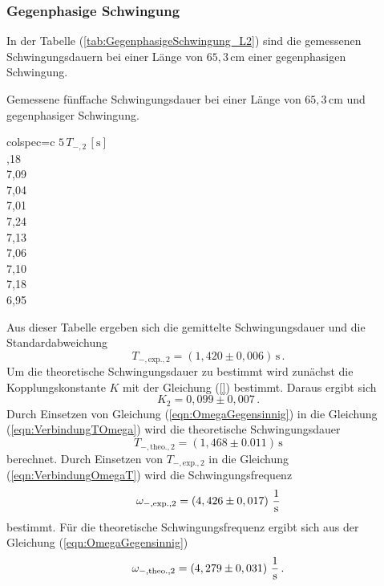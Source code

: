 \subsubsection{Gegenphasige Schwingung}
\label{sec:GegenphasigeSchwingung_LangesPendel}
In der Tabelle (\ref{tab:GegenphasigeSchwingung_L2}) sind die gemessenen Schwingungsdauern bei einer Länge von $65,3\, \unit{\centi\meter}$ einer gegenphasigen
Schwingung. 
\begin{table}[H]
  \centering
  \caption{Gemessene fünffache Schwingungsdauer bei einer Länge von $65,3\, \unit{\centi\meter}$ und gegenphasiger Schwingung.}
  \label{tab:GegenphasigeSchwingung_L2}
  \begin{tblr}{colspec={c}}
      \toprule
      $5\, T_{-, 2}\,\left[\unit{\second}\right]$\\
      ,18 \\
      7,09 \\
      7,04 \\
      7,01 \\
      7,24 \\
      7,13 \\
      7,06 \\
      7,10 \\
      7,18 \\
      6,95 \\
      \bottomrule
  \end{tblr}
\end{table}
Aus dieser Tabelle ergeben sich die gemittelte Schwingungsdauer und die Standardabweichung
$$T_{-,\text{exp.},2} = \left(1,420 \pm 0,006\right)\,\unit{\second}\,.$$
Um die theoretische Schwingungsdauer zu bestimmt wird zunächst die Kopplungskonstante $K$ mit der
Gleichung (\ref{}) bestimmt. Daraus ergibt sich
$$K_{2} = 0,099 \pm 0,007\,.$$
Durch Einsetzen von Gleichung (\ref{eqn:OmegaGegensinnig}) in die Gleichung (\ref{eqn:VerbindungTOmega}) wird die theoretische Schwingungsdauer 
$$T_{-,\text{theo.},2} = \left( 1,468 \pm 0.011 \right)\,\unit{\second}$$ berechnet. Durch Einsetzen von
$T_{-,\text{exp.},2}$ in die Gleichung (\ref{eqn:VerbindungOmegaT}) wird die Schwingungsfrequenz 
$$\omega_{-,\text{exp.},2} = \left(4,426 \pm 0,017 \right)\, \unit[per-mode=fraction]{\per\second}$$ bestimmt. 
Für die theoretische Schwingungsfrequenz ergibt sich aus der Gleichung (\ref{eqn:OmegaGegensinnig}) 
$$\omega_{-,\text{theo.},2} = \left( 4,279 \pm 0,031 \right)\, \unit[per-mode=fraction]{\per\second}\,.$$
%
%

